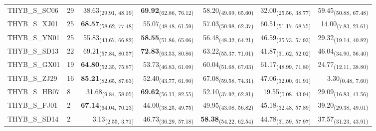\begin{table}[p]
\begin{tabular}{llrrrrr}
THYB\_S\_SC06 & 29 & 38.63\textsubscript{(29.91, 48.19)} & \textbf{69.92}\textsubscript{(62.86, 76.12)} & 58.20\textsubscript{(49.69, 65.60)} & 32.00\textsubscript{(25.56, 38.77)} & 59.45\textsubscript{(50.88, 67.48)} \\
THYB\_S\_XJ01 & 25 & \textbf{68.57}\textsubscript{(58.62, 77.48)} & 55.07\textsubscript{(48.48, 61.59)} & 57.03\textsubscript{(50.98, 62.37)} & 60.51\textsubscript{(51.17, 68.75)} & 14.00\textsubscript{(7.83, 21.61)} \\
THYB\_S\_YN01 & 25 & 55.83\textsubscript{(43.67, 66.82)} & \textbf{58.55}\textsubscript{(51.86, 65.06)} & 56.48\textsubscript{(48.32, 64.21)} & 46.59\textsubscript{(35.73, 57.93)} & 29.32\textsubscript{(19.14, 40.82)} \\
THYB\_S\_SD13 & 22 & 69.21\textsubscript{(57.84, 80.57)} & \textbf{72.83}\textsubscript{(63.53, 80.86)} & 63.22\textsubscript{(55.37, 71.01)} & 41.87\textsubscript{(31.62, 52.02)} & 46.04\textsubscript{(34.90, 56.40)} \\
THYB\_S\_GX01 & 19 & \textbf{64.80}\textsubscript{(52.35, 75.87)} & 53.73\textsubscript{(46.83, 61.09)} & 60.04\textsubscript{(51.68, 67.03)} & 61.17\textsubscript{(48.99, 71.80)} & 24.77\textsubscript{(12.11, 38.80)} \\
THYB\_S\_ZJ29 & 16 & \textbf{85.21}\textsubscript{(82.65, 87.63)} & 52.40\textsubscript{(43.77, 61.90)} & 67.08\textsubscript{(59.58, 74.31)} & 47.06\textsubscript{(32.00, 61.91)} & 3.30\textsubscript{(0.48, 7.60)} \\
THYB\_S\_HB07 & 8 & 31.68\textsubscript{(9.84, 58.05)} & \textbf{69.62}\textsubscript{(56.11, 82.55)} & 52.10\textsubscript{(37.92, 62.81)} & 19.55\textsubscript{(0.08, 43.94)} & 29.09\textsubscript{(16.83, 41.56)} \\
THYB\_S\_FJ01 & 2 & \textbf{67.14}\textsubscript{(64.04, 70.23)} & 44.00\textsubscript{(38.25, 49.75)} & 49.95\textsubscript{(43.08, 56.82)} & 45.18\textsubscript{(32.48, 57.89)} & 39.20\textsubscript{(29.38, 49.01)} \\
THYB\_S\_SD14 & 2 & 3.13\textsubscript{(2.55, 3.71)} & 46.73\textsubscript{(36.29, 57.18)} & \textbf{58.38}\textsubscript{(54.22, 62.54)} & 44.78\textsubscript{(31.59, 57.97)} & 37.57\textsubscript{(31.23, 43.91)} \\
\bottomrule
\end{tabular}
\end{table}
\clearpage
